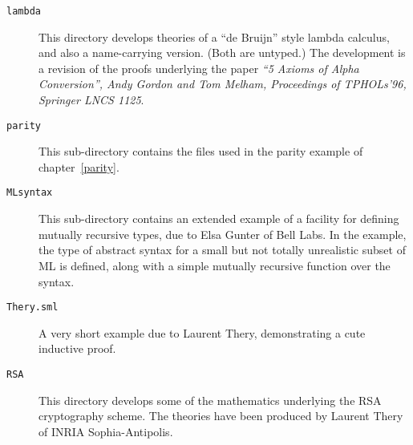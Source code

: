 \begin{description}
\item[\tt lambda]

This directory develops theories of a ``de Bruijn'' style lambda calculus,
and also a name-carrying version. (Both are untyped.) The development
is a revision of the proofs underlying the paper
{\it ``5 Axioms of Alpha Conversion'',
            Andy Gordon and Tom Melham,
            Proceedings of TPHOLs'96, Springer LNCS 1125}.

\item[\tt parity]

  This sub-directory contains the files used in the parity example of
  chapter~\ref{parity}.

\item [\tt MLsyntax]

  This sub-directory contains an extended example of a facility for
  defining mutually recursive types, due to Elsa Gunter of Bell Labs.
  In the example, the type of abstract syntax for a small but not
  totally unrealistic subset of ML is defined, along with a simple
  mutually recursive function over the syntax.

\item[\tt Thery.sml]

  A very short example due to Laurent Thery, demonstrating a cute
  inductive proof.

\item[\tt RSA]

       This directory develops some of the mathematics underlying
       the RSA cryptography scheme. The theories have been
       produced by Laurent Thery of INRIA Sophia-Antipolis.

\end{description}


